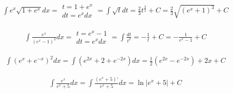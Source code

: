 
\begin{gather*}\int e^x\sqrt{1+e^x}dx =\begin{array}{|l|}
t=1+e^x \\
dt=e^xdx
\end{array}= \int \sqrt{t}dt = \frac{2}{3}t^{\frac{3}{2}}+C = \frac{2}{3}\sqrt{(e^x+1)^3}+C\end{gather*}



\begin{gather*}\int \frac{e^x}{(e^x-1)^2}dx =\begin{array}{|l|}
t=e^x-1 \\
dt=e^xdx
\end{array}= \int \frac{dt}{t^2}=-\frac{1}{t}+C = -\frac{1}{e^x-1}+C\end{gather*}



\begin{gather*}\int (e^x+e^{-x})^2dx = \int (e^{2x}+2+e^{-2x})dx = \frac{1}{2}(e^{2x}-e^{-2x})+2x+C\end{gather*}



\begin{gather*}\int \frac{e^x}{e^x+5}dx = \int \frac{(e^x+5)'}{e^x+5}dx= \ln|e^x+5|+C\end{gather*}



